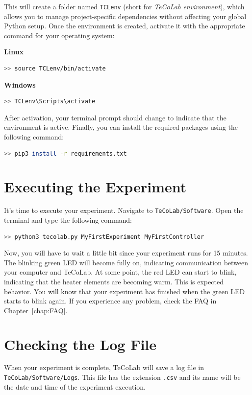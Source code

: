 \documentclass[12pt]{report}
\begin{document}
This will create a folder named \texttt{TCLenv} (short for \emph{TeCoLab environment}), which allows you to manage project-specific dependencies without affecting your global Python setup. Once the environment is created, activate it with the appropriate command for your operating system:

\textbf{Linux}
\begin{lstlisting}[language=bash]
>> source TCLenv/bin/activate
\end{lstlisting}

\textbf{Windows}
\begin{lstlisting}[language=bash]
>> TCLenv\Scripts\activate
\end{lstlisting}

After activation, your terminal prompt should change to indicate that the environment is active. Finally, you can install the required packages using the following command:

\begin{lstlisting}[language=bash]
>> pip3 install -r requirements.txt
\end{lstlisting}

\section{Executing the Experiment}

It's time to execute your experiment. Navigate to \texttt{TeCoLab/Software}. Open the terminal and type the following command:

\begin{lstlisting}[language=bash]
>> python3 tecolab.py MyFirstExperiment MyFirstController
\end{lstlisting}

Now, you will have to wait a little bit since your experiment runs for 15 minutes. The blinking green LED will become fully on, indicating communication between your computer and TeCoLab. At some point, the red LED can start to blink, indicating that the heater elements are becoming warm. This is expected behavior. You will know that your experiment has finished when the green LED starts to blink again. If you experience any problem, check the FAQ in Chapter~\ref{chap:FAQ}.


\section{Checking the Log File}

When your experiment is complete, TeCoLab will save a log file in \texttt{TeCoLab/Software/Logs}. This file has the extension \texttt{.csv} and its name will be the date and time of the experiment execution.
\end{document}
